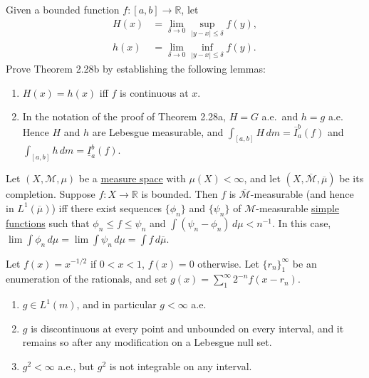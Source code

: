	\begin{exercise}[Folland 2.23]
		Given a bounded function $f : [a, b] \to \mathbb{R}$, let
		\begin{align}
			H(x) &= \lim_{\delta \to 0} \sup_{|y-x| \le \delta} f(y), \\
			h(x) &= \lim_{\delta \to 0} \inf_{|y-x| \le \delta} f(y).
		\end{align}
		Prove Theorem 2.28b by establishing the following lemmas:
		\begin{enumerate}[label=\textbf{\alph*.}]
			\item $H(x) = h(x)$ iff $f$ is continuous at $x$.
			\item In the notation of the proof of Theorem 2.28a, $H = G$ a.e.\ and $h = g$ a.e. Hence $H$ and $h$ are Lebesgue measurable, and $\int_{[a, b]} H \, dm = \overline{I}_a^b(f)$ and $\int_{[a, b]} h \, dm = \underline{I}_a^b(f)$.
		\end{enumerate}
	\end{exercise}
	\begin{solution}

	\end{solution}

	\begin{exercise}[Folland 2.24]
		Let $(X, \mathcal{M}, \mu)$ be a \hyperref[def:measure-space]{measure space} with $\mu(X) < \infty$, and let $(X, \overline{\mathcal{M}}, \overline{\mu})$ be its completion. Suppose $f : X \to \mathbb{R}$ is bounded. Then $f$ is $\overline{\mathcal{M}}$-measurable (and hence in $L^1(\overline{\mu})$) iff there exist sequences $\{\phi_n\}$ and $\{\psi_n\}$ of $\mathcal{M}$-measurable \hyperref[def:simple-functions]{simple functions} such that $\phi_n \le f \le \psi_n$ and $\int (\psi_n - \phi_n) \, d\mu < n^{-1}$. In this case, $\lim \int \phi_n \, d\mu = \lim \int \psi_n \, d\mu = \int f \, d\overline{\mu}$.
	\end{exercise}
	\begin{solution}

	\end{solution}

	\begin{exercise}[Folland 2.25]
		Let $f(x) = x^{-1/2}$ if $0 < x < 1$, $f(x) = 0$ otherwise. Let $\{r_n\}_1^\infty$ be an enumeration of the rationals, and set $g(x) = \sum_1^\infty 2^{-n} f(x - r_n)$.
		\begin{enumerate}[label=\textbf{\alph*.}]
			\item $g \in L^1(m)$, and in particular $g < \infty$ a.e.
			\item $g$ is discontinuous at every point and unbounded on every interval, and it remains so after any modification on a Lebesgue null set.
			\item $g^2 < \infty$ a.e., but $g^2$ is not integrable on any interval.
		\end{enumerate}
	\end{exercise}
	\begin{solution}

	\end{solution}

